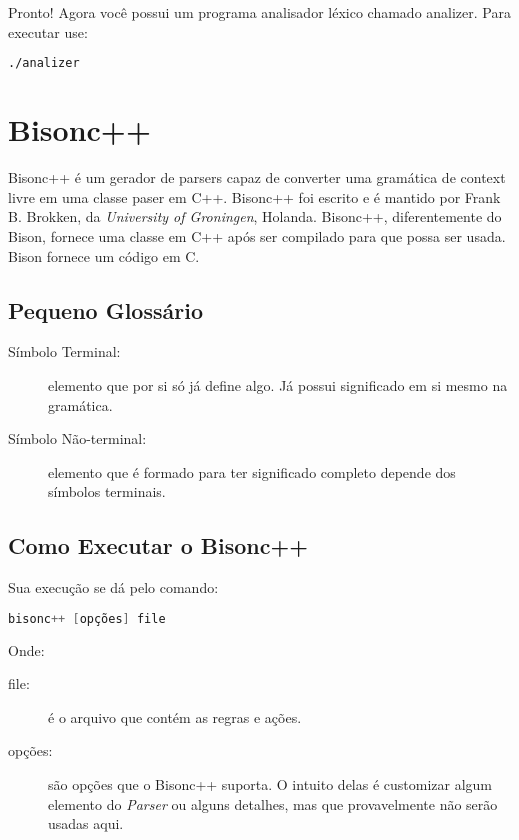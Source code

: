 \begin{apendicesenv}
\par 
\indent Pronto! Agora você possui um programa analisador léxico chamado analizer. Para executar use:
\begin{lstlisting}[language=make, label=apendiceCodigoFlex8, caption=Executanto o programa]
./analizer
\end{lstlisting}

\section{ Bisonc++}

Bisonc++ é um gerador de parsers capaz de converter uma gramática de context livre em uma classe paser em C++. Bisonc++ foi escrito e é mantido por Frank B. Brokken, da \textit{University of Groningen}, Holanda. Bisonc++, diferentemente do Bison, fornece uma classe em C++ após ser compilado para que possa ser usada. Bison fornece um código em C.

\subsection{Pequeno Glossário}
\begin{description}
\item[Símbolo Terminal:] elemento que por si só já define algo. Já possui significado em si mesmo na gramática.
\item[Símbolo Não-terminal: ] elemento que é formado para ter significado completo depende dos símbolos terminais.
\end{description}

\subsection{Como Executar o Bisonc++}
Sua execução se dá pelo comando:

\begin{lstlisting}[language=c, caption=Comando para executar bisonc++]
bisonc++ [opções] file
\end{lstlisting}

\par
\indent Onde:
\begin{description}
\item[file:] é o arquivo que contém as regras e ações.
\item[opções:] são opções que o Bisonc++ suporta. O intuito delas é customizar algum elemento do \textit{Parser} ou alguns detalhes, mas que provavelmente não serão usadas aqui.
\end{description}


\end{apendicesenv}
